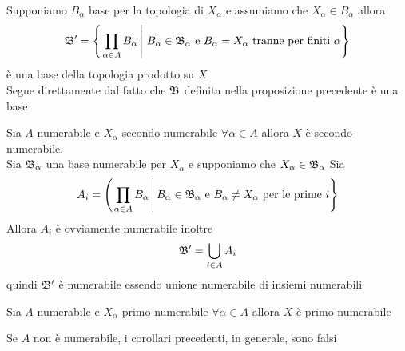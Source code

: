 \spazio
\begin{oss}Supponiamo $B_\alpha $ base per la topologia di $X_\alpha$ e assumiamo che $X_\alpha \in B_\alpha$ allora
$$\mathfrak{B}'=\left\{ \left. \prod _{\alpha \in A} B_\alpha \, \right\vert\, B_\alpha \in \mathfrak{B}_\alpha \text{ e } B_\alpha=X_\alpha \text{ tranne per finiti } \alpha \right\}$$
\`e una base della topologia prodotto su $X$\\
Segue direttamente dal fatto che $\mathfrak{B}$ definita nella proposizione precedente \`e una base
\end{oss}
\begin{cor}Sia $A$ numerabile e $X_\alpha$ secondo-numerabile $\forall\alpha\in A$ allora $X$ \`e secondo-numerabile.\\
\proof Sia $\mathfrak{B}_\alpha$ una base numerabile per $X_\alpha$ e supponiamo che $X_\alpha\in \mathfrak{B}_\alpha$
Sia 
$$A_i= \left(  \left.\prod_{\alpha\in A} B_\alpha \, \right \vert B_\alpha \in \mathfrak{B}_\alpha  \text{ e } B_\alpha\neq X_\alpha \text{ per le prime } i  \right\}$$
Allora $A_i$ \`e ovviamente numerabile inoltre 
$$\mathfrak{B}'=\bigcup_{i \in A } A_i$$
quindi $\mathfrak{B}'$ \`e numerabile essendo unione numerabile di insiemi numerabili
\endproof
\end{cor}
\begin{cor}Sia $A$ numerabile e $X_\alpha$ primo-numerabile $\forall\alpha\in A$ allora $X$ \`e primo-numerabile
\end{cor}
\begin{oss}Se $A$ non \`e numerabile, i corollari precedenti, in generale, sono falsi
\end{oss}
\newpage

